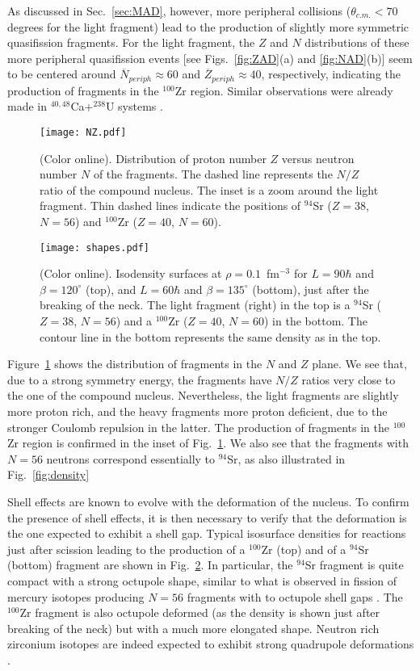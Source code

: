 \documentclass[reprint,aps,prc,twocolumn,floatfix,10pt]{revtex4-2}
\begin{document}
As discussed in Sec.~\ref{sec:MAD}, however, more peripheral collisions ($\theta_{c.m.}<70$ degrees for the light fragment) lead to the production of slightly more symmetric quasifission fragments.
For the light fragment, the $Z$ and $N$ distributions of these more peripheral quasifission events [see Figs.~\ref{fig:ZAD}(a) and \ref{fig:NAD}(b)] seem to be centered around $\overline{N}_{periph}\approx60$ and $\overline{Z}_{periph}\approx40$, respectively, indicating the production of fragments in the $^{100}$Zr region.
Similar observations were already made in $^{40,48}$Ca+$^{238}$U systems \cite{oberacker2014}.
\begin{figure}[!htb]
\centerline{\texttt{[image: NZ.pdf]}}
\caption{\protect(Color online). Distribution of proton number $Z$ versus neutron number $N$ of the fragments. The dashed line represents the $N/Z$ ratio of the compound nucleus.
The inset is a zoom around the light fragment. Thin dashed lines indicate the positions of $^{94}$Sr ($Z=38$, $N=56$) and $^{100}$Zr ($Z=40$, $N=60$).}
\label{fig:NZ}
\end{figure}
\begin{figure}[!htb]
\centerline{\texttt{[image: shapes.pdf]}}
\caption{\protect(Color online). Isodensity surfaces at $\rho=0.1$~fm$^{-3}$ for $L=90\hbar$ and $\beta=120^{\circ}$ (top), and $L=60\hbar$ and $\beta=135^{\circ}$ (bottom), just after the breaking of the neck. The light fragment (right) in the top is a $^{94}$Sr ($Z=38$, $N=56$) and a $^{100}$Zr ($Z=40$, $N=60$) in the bottom. The contour line in the bottom represents the same density as in the top. }
\label{fig:shapes}
\end{figure}

Figure~\ref{fig:NZ}  shows the distribution of fragments in the $N$ and $Z$ plane.
We see that, due to a strong symmetry energy, the fragments have $N/Z$ ratios very close to the one of the compound nucleus.
Nevertheless, the light fragments are slightly more proton rich, and the heavy fragments more proton deficient, due to the stronger Coulomb repulsion in the latter.
The production of fragments in the $^{100}$Zr region is confirmed in the inset of Fig.~\ref{fig:NZ}. We also see that the fragments with $N=56$ neutrons correspond essentially to $^{94}$Sr, as also illustrated in Fig.~\ref{fig:density}

Shell effects are known to evolve with the deformation of the nucleus.
To confirm the presence of shell effects, it is then necessary to verify that the deformation is the one expected to exhibit a shell gap.
Typical isosurface densities for reactions just after scission leading to the production of a $^{100}$Zr (top) and of a $^{94}$Sr (bottom) fragment are shown in Fig.~\ref{fig:shapes}.
In particular, the $^{94}$Sr fragment is quite compact with a strong octupole shape, similar to what is observed in fission of mercury isotopes producing $N=56$ fragments with to octupole shell gaps \cite{scamps2019}.
The $^{100}$Zr fragment is also octupole deformed (as the density is shown just after breaking of the neck) but with a much more elongated shape.
Neutron rich zirconium isotopes are indeed expected to exhibit strong quadrupole deformations \cite{lalazissis1999,blazkiewicz2005,hwang2006}.
\end{document}
